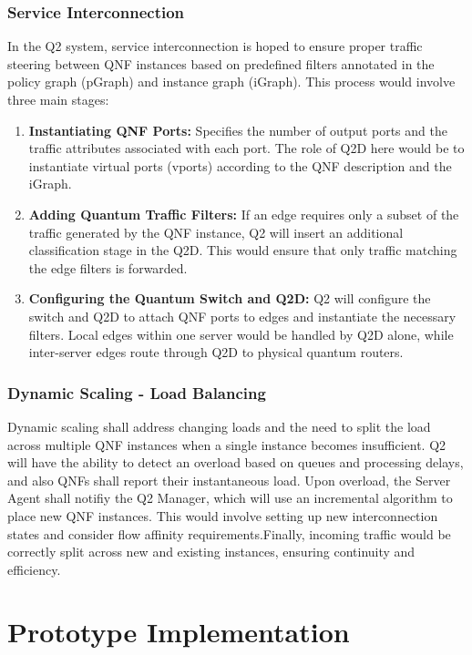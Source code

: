 \documentclass[sigplan,screen]{acmart}
\begin{document}
\subsubsection{Service Interconnection}
In the Q2 system, service interconnection is hoped to ensure proper traffic steering between QNF instances based on predefined filters annotated in the policy graph (pGraph) and instance graph (iGraph). This process would involve three main stages:
\begin{enumerate}
    \item \textbf{Instantiating QNF Ports:} Specifies the number of output ports and the traffic attributes associated with each port. The role of Q2D here would be to instantiate virtual ports (vports) according to the QNF description and the iGraph.
    
    \item \textbf{Adding Quantum Traffic Filters: } If an edge requires only a subset of the traffic generated by the QNF instance, Q2 will insert an additional classification stage in the Q2D. This would ensure that only traffic matching the edge filters is forwarded.

    \item \textbf{Configuring the Quantum Switch and Q2D:} Q2 will configure the switch and Q2D to attach QNF ports to edges and instantiate the necessary filters. Local edges within one server would be handled by Q2D alone, while inter-server edges route through Q2D to physical quantum routers.
\end{enumerate}

\subsubsection{Dynamic Scaling - Load Balancing}
Dynamic scaling shall address changing loads and the need to split the load across multiple QNF instances when a single instance becomes insufficient. Q2 will have the ability to detect an overload based on queues and processing delays, and also QNFs shall report their instantaneous load. Upon overload, the Server Agent shall notifiy the Q2 Manager, which will use an incremental algorithm to place new QNF instances. This would involve setting up new interconnection states and consider flow affinity requirements.Finally, incoming traffic would be correctly split across new and existing instances, ensuring continuity and efficiency.

\section{Prototype Implementation}
\end{document}
